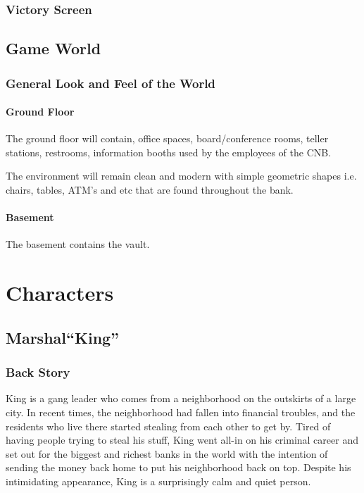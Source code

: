 \documentclass[14pt]{report}
\begin{document}
\subsection{Victory Screen}

\section{Game World}

\subsection{General Look and Feel of the World}

\subsubsection{Ground Floor}

The ground floor will contain, office spaces, board/conference rooms, teller stations, restrooms, information booths used by the employees of the CNB.

The environment will remain clean and modern with simple geometric shapes i.e. chairs, tables, ATM’s and etc that are found throughout the bank.

\subsubsection{Basement}
The basement contains the vault.

\chapter{Characters}

\section{Marshal``King''}

\subsection{Back Story}

King is a gang leader who comes from a neighborhood on the outskirts of a large city. In recent times, the neighborhood had fallen into financial troubles, and the residents who live there started stealing from each other to get by. Tired of having people trying to steal his stuff, King went all-in on his criminal career and set out for the biggest and richest banks in the world with the intention of sending the money back home to put his neighborhood back on top. Despite his intimidating appearance, King is a surprisingly calm and quiet person.
\end{document}
